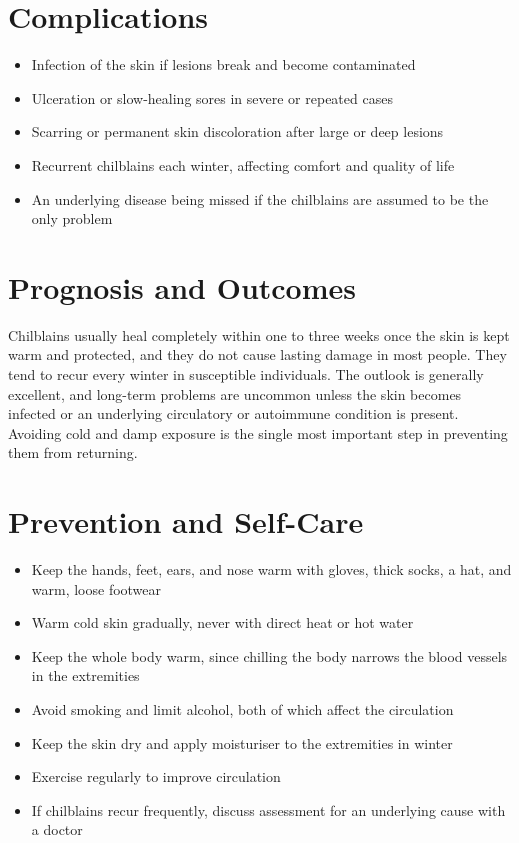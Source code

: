 \section*{Complications}
\begin{itemize}
    \item Infection of the skin if lesions break and become contaminated
    \item Ulceration or slow-healing sores in severe or repeated cases
    \item Scarring or permanent skin discoloration after large or deep lesions
    \item Recurrent chilblains each winter, affecting comfort and quality of life
    \item An underlying disease being missed if the chilblains are assumed to be the only problem
\end{itemize}

\section*{Prognosis and Outcomes}
Chilblains usually heal completely within one to three weeks once the skin is kept warm and protected, and they do not cause lasting damage in most people. They tend to recur every winter in susceptible individuals. The outlook is generally excellent, and long-term problems are uncommon unless the skin becomes infected or an underlying circulatory or autoimmune condition is present. Avoiding cold and damp exposure is the single most important step in preventing them from returning.

\section*{Prevention and Self-Care}
\begin{itemize}
    \item Keep the hands, feet, ears, and nose warm with gloves, thick socks, a hat, and warm, loose footwear
    \item Warm cold skin gradually, never with direct heat or hot water
    \item Keep the whole body warm, since chilling the body narrows the blood vessels in the extremities
    \item Avoid smoking and limit alcohol, both of which affect the circulation
    \item Keep the skin dry and apply moisturiser to the extremities in winter
    \item Exercise regularly to improve circulation
    \item If chilblains recur frequently, discuss assessment for an underlying cause with a doctor
\end{itemize}

